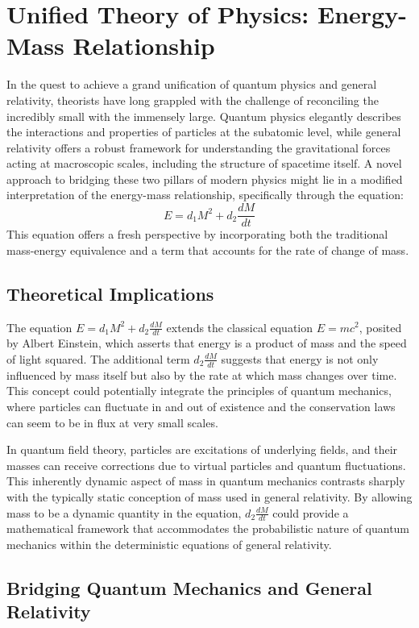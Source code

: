 \documentclass{article}
\begin{document}
\section*{Unified Theory of Physics: Energy-Mass Relationship}
In the quest to achieve a grand unification of quantum physics and general relativity, theorists have long grappled with the challenge of reconciling the incredibly small with the immensely large. Quantum physics elegantly describes the interactions and properties of particles at the subatomic level, while general relativity offers a robust framework for understanding the gravitational forces acting at macroscopic scales, including the structure of spacetime itself. A novel approach to bridging these two pillars of modern physics might lie in a modified interpretation of the energy-mass relationship, specifically through the equation:
\[
E = d_1 M^2 + d_2 \frac{dM}{dt}
\]
This equation offers a fresh perspective by incorporating both the traditional mass-energy equivalence and a term that accounts for the rate of change of mass.

\subsection*{Theoretical Implications}

The equation \(E = d_1 M^2 + d_2 \frac{dM}{dt}\) extends the classical equation \(E = mc^2\), posited by Albert Einstein, which asserts that energy is a product of mass and the speed of light squared. The additional term \(d_2 \frac{dM}{dt}\) suggests that energy is not only influenced by mass itself but also by the rate at which mass changes over time. This concept could potentially integrate the principles of quantum mechanics, where particles can fluctuate in and out of existence and the conservation laws can seem to be in flux at very small scales.

In quantum field theory, particles are excitations of underlying fields, and their masses can receive corrections due to virtual particles and quantum fluctuations. This inherently dynamic aspect of mass in quantum mechanics contrasts sharply with the typically static conception of mass used in general relativity. By allowing mass to be a dynamic quantity in the equation, \(d_2 \frac{dM}{dt}\) could provide a mathematical framework that accommodates the probabilistic nature of quantum mechanics within the deterministic equations of general relativity.

\subsection*{Bridging Quantum Mechanics and General Relativity}
\end{document}
